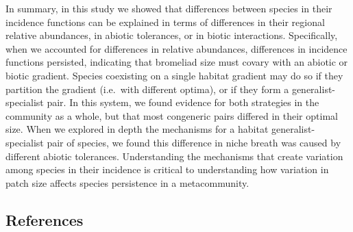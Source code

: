 In summary, in this study we showed that differences between species in
their incidence functions can be explained in terms of differences in
their regional relative abundances, in abiotic tolerances, or in biotic
interactions. Specifically, when we accounted for differences in
relative abundances, differences in incidence functions persisted,
indicating that bromeliad size must covary with an abiotic or biotic
gradient. Species coexisting on a single habitat gradient may do so if
they partition the gradient (i.e.~with different optima), or if they
form a generalist-specialist pair. In this system, we found evidence for
both strategies in the community as a whole, but that most congeneric
pairs differed in their optimal size. When we explored in depth the
mechanisms for a habitat generalist-specialist pair of species, we found
this difference in niche breath was caused by different abiotic
tolerances. Understanding the mechanisms that create variation among
species in their incidence is critical to understanding how variation in
patch size affects species persistence in a metacommunity.

\subsection{References}\label{references}
